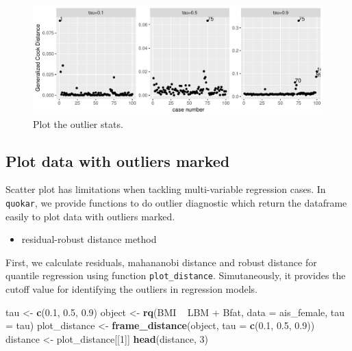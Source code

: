 \documentclass[11pt,a4paper,]{article}
\newenvironment{Shaded}{\begin{snugshade}}{\end{snugshade}}
\newcommand{\KeywordTok}[1]{\textcolor[rgb]{0.13,0.29,0.53}{\textbf{{#1}}}}
\newcommand{\DataTypeTok}[1]{\textcolor[rgb]{0.13,0.29,0.53}{{#1}}}
\newcommand{\DecValTok}[1]{\textcolor[rgb]{0.00,0.00,0.81}{{#1}}}
\newcommand{\FloatTok}[1]{\textcolor[rgb]{0.00,0.00,0.81}{{#1}}}
\newcommand{\StringTok}[1]{\textcolor[rgb]{0.31,0.60,0.02}{{#1}}}
\newcommand{\NormalTok}[1]{{#1}}
\providecommand{\tightlist}{%
  \setlength{\itemsep}{0pt}\setlength{\parskip}{0pt}}
\theoremstyle{definition}
\theoremstyle{definition}
\theoremstyle{remark}
\begin{document}
\begin{figure}

{\centering \includegraphics{Diagnosing_outliers_and_visualization_of_quantile_regression_models_files/figure-latex/unnamed-chunk-5-1} 

}

\caption{Plot the outlier stats.}\label{fig:unnamed-chunk-5}
\end{figure}

\subsection{Plot data with outliers
marked}\label{plot-data-with-outliers-marked}

Scatter plot has limitations when tackling multi-variable regression
cases. In \texttt{quokar}, we provide functions to do outlier diagnostic
which return the dataframe easily to plot data with outliers marked.

\begin{itemize}
\tightlist
\item
  residual-robust distance method
\end{itemize}

First, we calculate residuals, mahananobi distance and robust distance
for quantile regression using function \texttt{plot\_distance}.
Simutaneously, it provides the cutoff value for identifying the outliers
in regression models.

\begin{Shaded}
\begin{Highlighting}[]
\NormalTok{tau <-}\StringTok{ }\KeywordTok{c}\NormalTok{(}\FloatTok{0.1}\NormalTok{, }\FloatTok{0.5}\NormalTok{, }\FloatTok{0.9}\NormalTok{)}
\NormalTok{object <-}\StringTok{ }\KeywordTok{rq}\NormalTok{(BMI ~}\StringTok{ }\NormalTok{LBM +}\StringTok{ }\NormalTok{Bfat, }\DataTypeTok{data =} \NormalTok{ais_female, }\DataTypeTok{tau =} \NormalTok{tau)}
\NormalTok{plot_distance <-}\StringTok{ }\KeywordTok{frame_distance}\NormalTok{(object, }\DataTypeTok{tau =} \KeywordTok{c}\NormalTok{(}\FloatTok{0.1}\NormalTok{, }\FloatTok{0.5}\NormalTok{, }\FloatTok{0.9}\NormalTok{))}
\NormalTok{distance <-}\StringTok{ }\NormalTok{plot_distance[[}\DecValTok{1}\NormalTok{]]}
\KeywordTok{head}\NormalTok{(distance, }\DecValTok{3}\NormalTok{)}
\end{Highlighting}
\end{Shaded}
\end{document}
